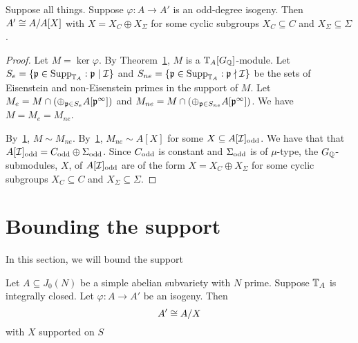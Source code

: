 \documentclass[thesis.tex]{subfiles}
\begin{document}
\begin{corollary}
    Suppose all things. Suppose $\varphi:A\to A'$ is an odd-degree isogeny.
    Then $A'\cong A/A[X]$ with $X=X_C\oplus X_\Sigma$ for some cyclic subgroups
    $X_C\subseteq C$ and $X_\Sigma\subseteq \Sigma$.
\end{corollary}
\begin{proof}
    Let $M=\ker\varphi$. By Theorem~\ref{}, $M$ is a $\mathbb{T}_A[G_{\mathbb{Q}}]$-module. Let
    $S_e = \{\mathfrak{p} \in \operatorname{Supp}_{\mathbb{T}_A}: \mathfrak{p} \mid \mathcal{I}\}$ and $S_{ne} = \{\mathfrak{p} \in
    \operatorname{Supp}_{\mathbb{T}_A}: \mathfrak{p} \nmid \mathcal{I}\}$ be the sets of Eisenstein and non-Eisenstein
    primes in the support of $M$. Let $M_e = M \cap (\oplus_{\mathfrak{p} \in S_e}
    A[\mathfrak{p}^\infty])$ and $M_{ne} = M\cap (\oplus_{\mathfrak{p} \in S_{ne}} A[\mathfrak{p}^\infty])$.
    We have $M = M_e = M_{ne}$.

    By~\ref{}, $M\sim M_{ne}$. By~\ref{}, $M_{ne}\sim A[X]$ for some
    $X\subseteq A[\mathcal{I}]_{\mathrm{odd}}$. We have that that $A[\mathcal{I}]_{\mathrm{odd}} = C_{\mathrm{odd}}\oplus
    \Sigma_{\mathrm{odd}}$. Since $C_{\mathrm{odd}}$ is constant and $\Sigma_{\mathrm{odd}}$ is of
    $\mu$-type, the $G_{\mathbb{Q}}$-submodules, $X$, of $A[\mathcal{I}]_{\mathrm{odd}}$ are of the form 
    $X=X_C\oplus X_\Sigma$ for some cyclic subgroups
    $X_C\subseteq C$ and $X_\Sigma\subseteq \Sigma$.
\end{proof}

\section{Bounding the support}

In this section, we will bound the support


\begin{proposition}
    Let $A\subseteq J_0(N)$ be a simple abelian subvariety with $N$ prime.
    Suppose $\mathbb{T}_A$ is integrally closed. Let $\varphi:A\to A'$ be an isogeny.
    Then
    \[
        A' \cong A/X
    \]
    with $X$ supported on $S$
\end{proposition}
\end{document}
